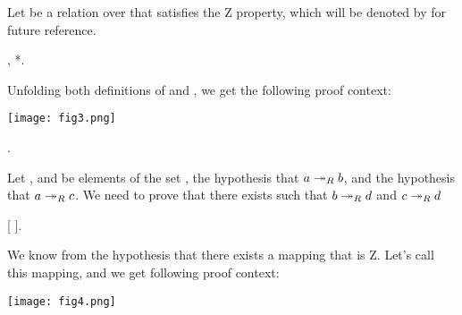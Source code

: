 Let  be a relation over  that satisfies
    the Z property, which will be denoted by  for future
    reference. \begin{coqdoccode}
\coqdocemptyline
\coqdocindent{1.00em}
 ,   *. \end{coqdoccode}
Unfolding both definitions of
   and , we get the following proof context:


      \texttt{[image: fig3.png]} \begin{coqdoccode}
\coqdocemptyline
\coqdocindent{1.00em}
     . \end{coqdoccode}
Let ,  and  be elements of
     the set ,  the hypothesis that $a \twoheadrightarrow_R b$, and
      the hypothesis that $a\twoheadrightarrow_R c$. We need to prove that
     there exists  such that $b\twoheadrightarrow_R d$ and $c\twoheadrightarrow_R d$ \begin{coqdoccode}
\coqdocemptyline
\coqdocindent{1.00em}
   [ ]. \end{coqdoccode}
We know from the hypothesis
      that there exists a mapping  that is Z. Let's call
      this mapping, and we get following proof context:


      \texttt{[image: fig4.png]}


